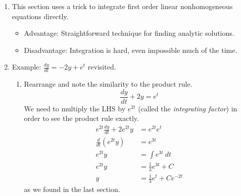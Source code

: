 \documentclass{article}
\newcommand{\ds}{\displaystyle}
\begin{document}
\begin{enumerate}

\item This section uses a trick to integrate first order linear nonhomogeneous equations directly. 
\begin{itemize}
\item Advantage: Straightforward technique for finding analytic solutions.
\item Disadvantage: Integration is hard, even impossible much of the time.
\end{itemize}

\item Example: $\ds \frac{dy}{dt} = -2y + e^t$ revisited.
\begin{enumerate}
\item Rearrange and note the similarity to the product rule. 
\[
\frac{dy}{dt} + 2y = e^t
\]
We need to multiply the LHS by $e^{2t}$ (called the \emph{integrating factor}) in order to see the product rule exactly.
\begin{align*}
e^{2t}\frac{dy}{dt} + 2e^{2t}y &= e^{2t}e^t \\
\frac{d}{dt}\left(e^{2t}y\right) &= e^{3t} \\
e^{2t}y &= \int e^{3t} ~dt \\
e^{2t}y &= \frac{1}{3} e^{3t} + C \\
y &= \frac{1}{3} e^{t} + Ce^{-2t} 
\end{align*}
as we found in the last section.
\end{enumerate}


\end{enumerate}
\end{document}
